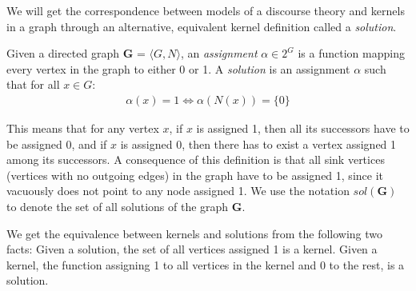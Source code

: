 We will get the correspondence between models of a discourse theory and kernels in a graph through an alternative, equivalent kernel definition called a \textit{solution}.
\begin{definition}
  Given a directed graph \textbf{G} = $\langle G,N \rangle$, an \textit{assignment} $\alpha \in 2^G$ is a function mapping every vertex in the graph to either 0 or 1.
  A \textit{solution} is an assignment $\alpha$ such that for all $x \in G:$
  \begin{align}
    \alpha(x) = 1 \iff \alpha(N(x)) = \{ 0 \}
  \end{align}
\end{definition}
This means that for any vertex $x$, if $x$ is assigned 1, then all its successors have to be assigned  0, and if $x$ is assigned 0, then there has to exist a vertex assigned 1 among its successors.
A consequence of this definition is that all sink vertices (vertices with no outgoing edges) in the graph have to be assigned 1, since it vacuously does not point to any node assigned 1.
We use the notation $sol(\mathbf{G})$ to denote the set of all solutions of the graph \textbf{G}.

We get the equivalence between kernels and solutions from the following two facts:
Given a solution, the set of all vertices assigned 1 is a kernel.
Given a kernel, the function assigning 1 to all vertices in the kernel and 0 to the rest, is a solution.
